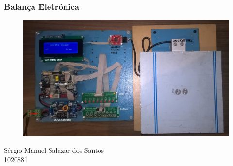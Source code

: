 \begin{frame}
	\frametitle{Balança Eletrónica}
	\begin{minipage}{\linewidth}
		\begin{figure}[ht]
			\begin{centering}
				\includegraphics[scale=0.07]{./image/PESTA/kit/Kit_Desenvolvimento_2}
			\end{centering}
		\end{figure}
	\end{minipage}
	\newline
	\vfill
	{ Sérgio Manuel Salazar dos Santos}\\
	1020881
\end{frame}
